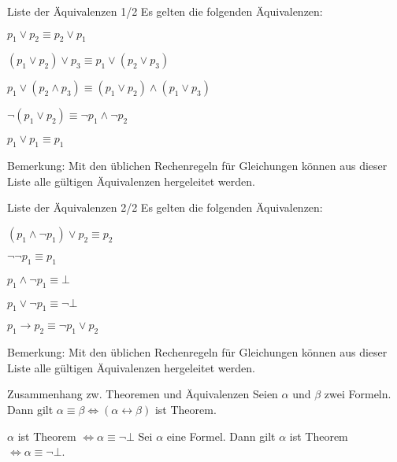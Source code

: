 \documentclass[avery5371]{flashcards}
\begin{document}
\begin{flashcard}{ Liste der Äquivalenzen 1/2 }
    Es gelten die folgenden Äquivalenzen:
    \begin{enumerate*}
        \item $p_1 \vee p_2 \equiv p_2 \vee p_1$
        \item $(p_1 \vee p_2 )\vee p_3 \equiv p_1 \vee (p_2 \vee p_3 )$
        \item $p_1 \vee (p_2 \wedge p_3 )\equiv (p_1 \vee p_2 )\wedge (p_1 \vee p_3 )$
        \item $\lnot(p_1 \vee p_2 )\equiv\lnot p_1 \wedge\lnot p_2$
        \item $p_1 \vee p_1 \equiv p_1$
    \end{enumerate*}
    Bemerkung: Mit den üblichen Rechenregeln für Gleichungen können aus dieser Liste alle gültigen Äquivalenzen hergeleitet werden.
\end{flashcard}

\begin{flashcard}{ Liste der Äquivalenzen 2/2 }
    Es gelten die folgenden Äquivalenzen:
    \begin{enumerate*}
        \item  $(p_1 \wedge \lnot p_1 )\vee p_2 \equiv p_2$
        \item  $\lnot\lnot p_1\equiv p_1$
        \item  $p_1 \wedge\lnot p_1 \equiv\bot$
        \item  $p_1 \vee\lnot p_1 \equiv\lnot\bot$
        \item  $p_1 \rightarrow p_2 \equiv \lnot p_1 \vee p_2$
    \end{enumerate*}
    Bemerkung: Mit den üblichen Rechenregeln für Gleichungen können aus dieser Liste alle gültigen Äquivalenzen hergeleitet werden.
\end{flashcard}

\begin{flashcard}{ Zusammenhang zw. Theoremen und Äquivalenzen }
    Seien $\alpha$ und $\beta$ zwei Formeln. Dann gilt $\alpha\equiv\beta\Leftrightarrow(\alpha\leftrightarrow\beta)$ ist Theorem.
\end{flashcard}

\begin{flashcard}{ $\alpha$ ist Theorem $\Leftrightarrow\alpha\equiv\lnot\bot$ }
    Sei $\alpha$ eine Formel. Dann gilt $\alpha$ ist Theorem $\Leftrightarrow\alpha\equiv\lnot\bot$.
\end{flashcard}
\end{document}
